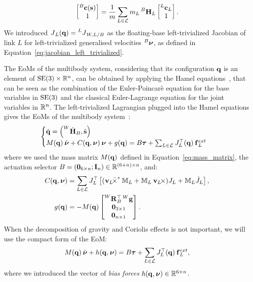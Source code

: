 %
\begin{equation*}
    \begin{bmatrix}{}^B\mathbf{c}(\Shape) \\ 1\end{bmatrix} =
    \frac{1}{m} \sum_{L\in\mathcal{L}} m_L \homo[B]_L \begin{bmatrix}{}^L\mathbf{c}_L\\1\end{bmatrix}
    .
\end{equation*}
%
We introduced $\jac_L(\Qu) = \jac[L]_{W,L/B}$ as the floating-base left-trivialized Jacobian of link $L$ for left-trivialized generalised velocities $\Nu[B]$, as defined in Equation~\eqref{eq:jacobian_left_trivialized}.

The \aclp{EoM} of the multibody system, considering that its configuration $\Qu$ is an element of $\SE(3)\times\realn^n$, can be obtained by applying the Hamel equations~\parencite{marsden_jerrold_e_introduction_2013, maruskin_dynamical_2018}, that can be seen as the combination of the Euler-Poincarè equation for the base variables in $\SE(3)$ and the classical Euler-Lagrange equation for the joint variables in $\realn^n$.
The left-trivialized Lagrangian plugged into the Hamel equations gives the \acp{EoM} of the multibody system~\parencite[Appendix~A.4]{traversaro_modelling_2017}:
%
\begin{equation}
    \label{eq:equation_of_motion_multibody}
    \begin{cases}
        \Qud = \left( \homod[W]_B, \Shaped \right)  \\
        M(\Qu) \Nud + C(\Qu, \Nu) \Nu + g(\Qu) = B \Torques + \sum_{L \in \mathcal{L}} J_{L}^\top(\Qu) \forcesix_L^{ext}
    \end{cases}
\end{equation}
%
where we used the mass matrix $M(\Qu)$ defined in Equation~\eqref{eq:mass_matrix}, the actuation selector $B = (\zeros_{6\times n}; \eye_n) \in \realn^{(6+n)\times n}$, and:
%
\begin{align*}
    C(\Qu, \Nu) &= \sum_{L\in\mathcal{L}} J_L^\top \left[ (\crossforsix[\velsix_L] \masssix_L + \masssix_L \crossvelsix[\velsix_L]) J_L + \masssix_L \dot{J}_L \right] ,\\
    g(\Qu) &= -M(\Qu) \begin{bmatrix}\rot[W]_B^\top \gravity[W] \\ \zeros_{3\times1} \\ \zeros_{n\times1}\end{bmatrix}
    .
\end{align*}
%
When the decomposition of gravity and Coriolis effects is not important, we will use the compact form of the \ac{EoM}:
%
\begin{equation}
    \label{eq:equation_of_motion_multibody_compact}
    M(\Qu) \Nud + h(\Qu, \Nu) = B \Torques + \sum_{L \in \mathcal{L}} J_{L}^\top(\Qu) \forcesix_L^{ext}
    ,
\end{equation}
%
where we introduced the vector of \emph{bias forces} $h(\Qu, \Nu) \in \realn^{6+n}$.

